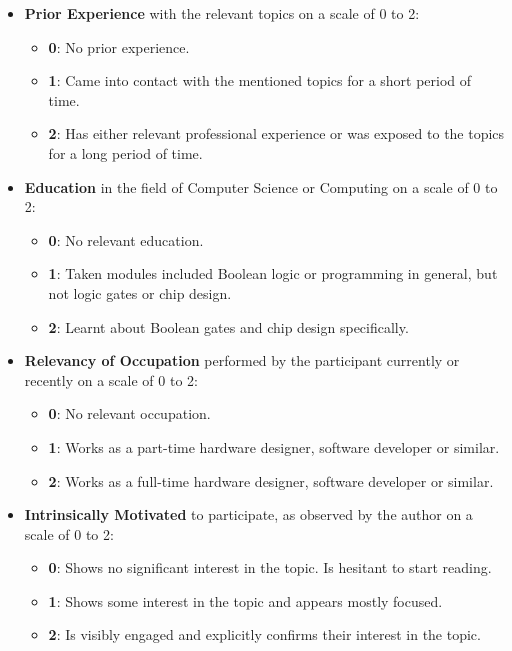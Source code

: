 \begin{itemize}
    \item \textbf{Prior Experience} with the relevant topics on a scale of 0 to 2:
        \begin{itemize}[]
            \item \textbf{0}: No prior experience.
            \item \textbf{1}: Came into contact with the mentioned topics for a short period of time.
            \item \textbf{2}: Has either relevant professional experience or was exposed to the topics for a long period of time.
        \end{itemize}
    \item \textbf{Education} in the field of Computer Science or Computing on a scale of 0 to 2:
    \begin{itemize}[]
        \item \textbf{0}: No relevant education.
        \item \textbf{1}: Taken modules included Boolean logic or programming in general, but not logic gates or chip design.
        \item \textbf{2}: Learnt about Boolean gates and chip design specifically.
    \end{itemize}
    \item \textbf{Relevancy of Occupation} performed by the participant currently or recently on a scale of 0 to 2:
    \begin{itemize}[]
        \item \textbf{0}: No relevant occupation.
        \item \textbf{1}: Works as a part-time hardware designer, software developer or similar.
        \item \textbf{2}: Works as a full-time hardware designer, software developer or similar.
    \end{itemize}
    \item \textbf{Intrinsically Motivated} to participate, as observed by the author on a scale of 0 to 2:
    \begin{itemize}[]
        \item \textbf{0}: Shows no significant interest in the topic. Is hesitant to start reading.
        \item \textbf{1}: Shows some interest in the topic and appears mostly focused.
        \item \textbf{2}: Is visibly engaged and explicitly confirms their interest in the topic.
    \end{itemize}

\end{itemize}
